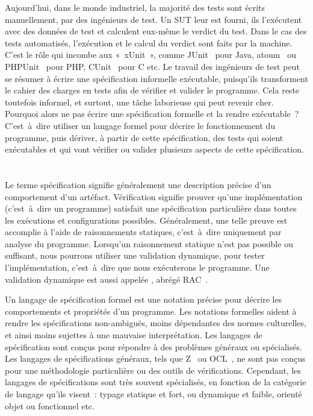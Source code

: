 Aujourd'hui, dans le monde industriel, la majorité des tests sont écrits
{\strong manuellement}, par des ingénieurs de test. Un SUT leur est fourni, ils
l'exécutent avec des données de test et calculent eux-même le verdict du test.
Dans le cas des tests {\strong automatisés}, l'exécution et le calcul du verdict
sont faits par la machine. C'est le rôle qui incombe aux 
«~xUnit~», comme JUnit~ pour Java, atoum~ ou
PHPUnit~ pour PHP, CUnit~ pour C etc. Le travail des
ingénieurs de test peut se résumer à écrire une spécification informelle
exécutable, puisqu'ils transforment le cahier des charges en tests afin de
vérifier et valider le programme. Cela reste toutefois informel, et surtout, une
tâche laborieuse qui peut revenir cher. Pourquoi alors ne pas écrire une
spécification formelle et la rendre exécutable~? C'est~à~dire utiliser un
langage formel pour décrire le fonctionnement du programme, puis dériver, à
partir de cette spécification, des tests qui soient exécutables et qui vont
vérifier ou valider plusieurs aspects de cette spécification.

\section{}

Le terme {\strong spécification} signifie généralement une description précise
d'un comportement d'un artéfact. {\strong Vérification} signifie prouver qu'une
implémentation (c'est~à~dire un programme) satisfait une spécification
particulière dans toutes les exécutions et configurations possibles.
Généralement, une telle preuve est accomplie à l'aide de raisonnements
statiques, c'est~à~dire uniquement par analyse du programme. Lorsqu'un
raisonnement statique n'est pas possible ou suffisant, nous pourrons utiliser
une {\strong validation} dynamique, pour tester l'implémentation, c'est~à~dire
que nous exécuterons le programme. Une validation dynamique est aussi appelée
, abrégé RAC~.

Un {\strong langage de spécification} formel est une notation précise pour
décrire les comportements et propriétés d'un programme. Les {\strong notations
formelles} aident à rendre les spécifications non-ambiguës, moins dépendantes
des normes culturelles, et ainsi moins sujettes à une mauvaise interprétation.
Les langages de spécification sont conçus pour répondre à des problèmes généraux
ou spécialisés. Les langages de spécifications généraux, tels que
Z~ ou OCL~, ne sont pas conçus pour une
méthodologie particulière ou des outils de vérifications. Cependant, les
langages de spécifications sont très souvent spécialisés, en fonction de la
catégorie de langage qu'ils visent~: typage statique et fort, ou dynamique et
faible, orienté objet ou fonctionnel etc.

